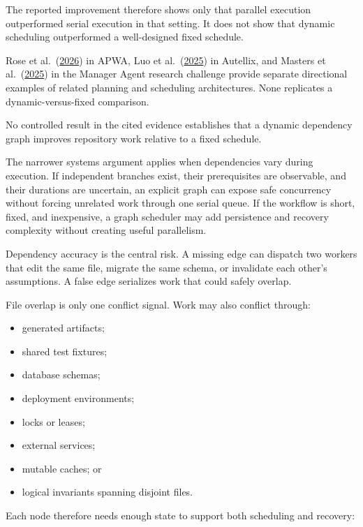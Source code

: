 The reported improvement therefore shows only that parallel execution outperformed serial execution in that setting. It does not show that dynamic scheduling outperformed a well-designed fixed schedule.

Rose et al.~(\href{https://arxiv.org/abs/2605.15132}{2026}) in APWA, Luo et al.~(\href{https://arxiv.org/abs/2502.13965}{2025}) in Autellix, and Masters et al.~(\href{https://arxiv.org/abs/2510.02557}{2025}) in the Manager Agent research challenge provide separate directional examples of related planning and scheduling architectures. None replicates a dynamic-versus-fixed comparison.

No controlled result in the cited evidence establishes that a dynamic dependency graph improves repository work relative to a fixed schedule.

The narrower systems argument applies when dependencies vary during execution. If independent branches exist, their prerequisites are observable, and their durations are uncertain, an explicit graph can expose safe concurrency without forcing unrelated work through one serial queue. If the workflow is short, fixed, and inexpensive, a graph scheduler may add persistence and recovery complexity without creating useful parallelism.

Dependency accuracy is the central risk. A missing edge can dispatch two workers that edit the same file, migrate the same schema, or invalidate each other's assumptions. A false edge serializes work that could safely overlap.


File overlap is only one conflict signal. Work may also conflict through:

\begin{itemize}
\tightlist
\item
  generated artifacts;
\item
  shared test fixtures;
\item
  database schemas;
\item
  deployment environments;
\item
  locks or leases;
\item
  external services;
\item
  mutable caches; or
\item
  logical invariants spanning disjoint files.
\end{itemize}

Each node therefore needs enough state to support both scheduling and recovery:

